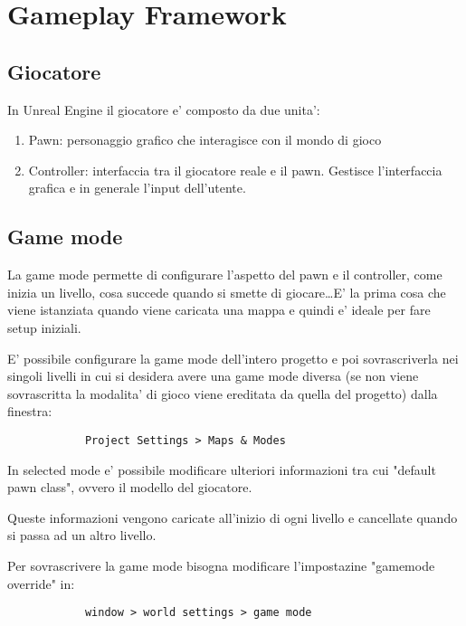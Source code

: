 
\chapter{Gameplay Framework}

    \section{Giocatore}
        In Unreal Engine il giocatore e' composto da due unita':
        \begin{enumerate}
            \item Pawn: personaggio grafico che interagisce con il mondo di gioco
            \item Controller: interfaccia tra il giocatore reale e il pawn. Gestisce l'interfaccia grafica e in generale l'input dell'utente.
        \end{enumerate}


    \section{Game mode}
        La game mode permette di configurare l'aspetto del pawn e il controller, come inizia un livello, cosa succede quando si smette di giocare\dots E' la prima cosa che viene istanziata quando viene caricata una mappa e quindi e' ideale per fare setup iniziali.

        E' possibile configurare la game mode dell'intero progetto e poi sovrascriverla nei singoli livelli in cui si desidera avere una game mode diversa (se non viene sovrascritta la modalita' di gioco viene ereditata da quella del progetto) dalla finestra:

        \begin{lstlisting}
            Project Settings > Maps & Modes
        \end{lstlisting}

        \begin{notebox}
            In selected mode e' possibile modificare ulteriori informazioni tra cui "default pawn class", ovvero il modello del giocatore.
        \end{notebox}

        Queste informazioni vengono caricate all'inizio di ogni livello e cancellate quando si passa ad un altro livello.

        Per sovrascrivere la game mode bisogna modificare l'impostazine "gamemode override" in:
        \begin{lstlisting}
            window > world settings > game mode
        \end{lstlisting}


